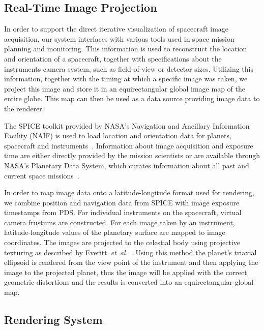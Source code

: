 \documentclass[journal]{vgtc}                %
\newcommand{\etal}{\emph{et~al.}}
\begin{document}
\subsection{Real-Time Image Projection} \label{sec:imageprojection}
In order to support the direct iterative visualization of spacecraft image acquisition, our system interfaces with various tools used in space mission planning and monitoring.
This information is used to reconstruct the location and orientation of a spacecraft, together with specifications about the instruments camera system, such as field-of-view or detector sizes.
Utilizing this information, together with the timing at which a specific image was taken, we project this image and store it in an equirectangular global image map of the entire globe. This map can then be used as a data source providing image data to the renderer.

The SPICE toolkit provided by NASA's Navigation and Ancillary Information Facility (NAIF) is used to load location and orientation data for planets, spacecraft and instruments~\cite{acton1996ancillary}.
Information about image acquisition and exposure time are either directly provided by the mission scientists or are available through NASA's Planetary Data System, which curates information about all past and current space missions~\cite{mcmahon1996overview}.

In order to map image data onto a latitude-longitude format used for rendering, we combine position and navigation data from SPICE with image exposure timestamps from PDS. For individual instruments on the spacecraft, virtual camera frustums are constructed. For each image taken by an instrument, latitude-longitude values of the planetary surface are mapped to image coordinates.
The images are projected to the celestial body using projective texturing as described by Everitt~\etal~\cite{Everitt:2001tg}.
Using this method the planet's triaxial ellipsoid is rendered from the view point of the instrument and then applying the image to the projected planet, thus the image will be applied with the correct geometric distortions and the results is converted into an equirectangular global map.

\subsection{Rendering System} \label{sec:renderingsystem}
\end{document}
